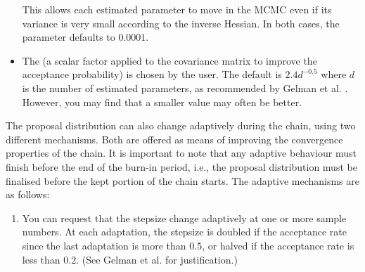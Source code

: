 \begin{itemize}
This allows each estimated parameter to move in the MCMC even if its variance is very small according to the inverse Hessian. In both cases, the  parameter defaults to $0.0001$.

\item The  (a scalar factor applied to the covariance matrix to improve the acceptance probability) is chosen by the user. The default is $2.4d^{-0.5}$ where $d$ is the number of estimated parameters, as recommended by Gelman et al. \citep{823}. However, you may find that a smaller value may often be better. 
\end{itemize}

The proposal distribution can also change adaptively during the chain, using two different mechanisms. Both are offered as means of improving the convergence properties of the chain. It is important to note that any adaptive behaviour must finish before the end of the burn-in period, i.e., the proposal distribution must be finalised before the kept portion of the chain starts. The adaptive mechanisms are as follows: 

\begin{enumerate}
\item You can request that the stepsize change adaptively at one or more sample numbers. At each adaptation, the stepsize is doubled if the acceptance rate since the last adaptation is more than $0.5$, or halved if the acceptance rate is less than $0.2$. (See Gelman et al. \citep{823} for justification.)

\end{enumerate}


